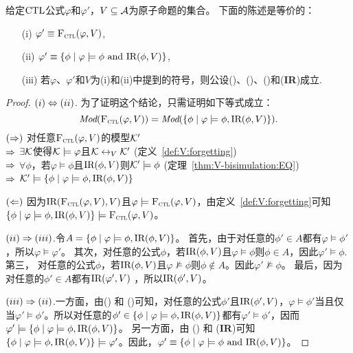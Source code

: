 \begin{theorem}\label{thm:close}
	给定$\textrm{CTL}$公式$\varphi$和$\varphi'$，$V \subseteq {\cal A}$为原子命题的集合。
	下面的陈述是等价的：
	\begin{itemize}
		\item[(i)] $\varphi' \equiv {\textsc{F}_{\textsc{ctl}}}(\varphi, V)$,
		\item[(ii)] $\varphi'\equiv \{\phi \mid\varphi \models \phi \text{ and } \textrm{IR}(\phi, V)\}$,
		\item[(iii)] 若$\varphi$、$\varphi'$和$V$为(i)和(ii)中提到的符号，则公设(\W)、(\PP)、(\NgP)和(\textbf{IR})成立. 
	\end{itemize}
\end{theorem}
\begin{proof}
	$(i) \Leftrightarrow (ii)$. 为了证明这个结论，只需证明如下等式成立：
	\[
	\textit{Mod}({\textsc{F}_{\textsc{ctl}}}(\varphi, V)) = \textit{Mod}(\{\phi \mid \varphi \models \phi, \textrm{IR}(\phi, V)\}).\]
	$(\Rightarrow)$ 对任意${\textsc{F}_{\textsc{ctl}}}(\varphi, V)$的模型${\cal K}'$ \\
	$\Rightarrow$  $\exists {\cal K}$使得${\cal K} \models \varphi$且${\cal K} \leftrightarrow_V {\cal K}'$ \hfill (定义~\ref{def:V:forgetting}) \\
	$\Rightarrow$ $\forall \phi$，若$\varphi \models \phi$且$\textrm{IR}(\phi, V)$则${\cal K}' \models \phi$  \hfill (定理~\ref{thm:V-bisimulation:EQ})\\
	$\Rightarrow$ ${\cal K}' \models \{\phi \mid \varphi \models \phi, \textrm{IR}(\phi, V)\}$
	
	$(\Leftarrow)$ 因为$\textrm{IR}({\textsc{F}_{\textsc{ctl}}}(\varphi, V),V)$且$\varphi \models {\textsc{F}_{\textsc{ctl}}}(\varphi, V)$，由定义~\ref{def:V:forgetting}可知$\{\phi \mid \varphi \models \phi, \textrm{IR}(\phi, V)\} \models {\textsc{F}_{\textsc{ctl}}}(\varphi, V)$。
	
	$(ii) \Rightarrow (iii)$.令$A = \{\phi \mid \varphi \models \phi, \textrm{IR}(\phi, V)\}$。 
	首先，由于对任意的$\phi'\in A$都有$\varphi \models \phi'$，所以$\varphi \models \varphi'$。
	其次，对任意的公式$\phi$，若$\textrm{IR}(\phi, V)$且$\varphi \models \phi$则$\phi \in A$，因此$\varphi' \models \phi$.
	第三， 对任意的公式$\phi$，若$\textrm{IR}(\phi, V)$且$\varphi \not \models \phi$则$\phi \not \in A$。因此$\varphi' \not \models \phi$。
	最后，因为对任意的$\phi' \in A$都有$\textrm{IR}(\varphi',V)$ ，所以$\textrm{IR}(\phi',V)$。
	
	$(iii) \Rightarrow (ii)$.一方面，由(\PP) 和 (\NgP)可知，对任意的公式$\phi'$且$\textrm{IR}(\phi',V)$，$\varphi \models \phi'$当且仅当$\varphi' \models \phi'$。所以对任意的$\phi'\in \{\phi \mid \varphi \models \phi, \textrm{IR}(\phi, V)\}$都有$\varphi' \models \phi'$，因而$\varphi' \models \{\phi \mid \varphi \models \phi, \textrm{IR}(\phi, V)\}$。 
	另一方面，由 (\W) 和 (\textbf{IR})可知$\{\phi \mid \varphi \models \phi, \textrm{IR}(\phi, V)\} \models \varphi'$。因此，$\varphi'\equiv \{\phi \mid\varphi \models \phi \text{ and } \textrm{IR}(\phi, V)\}$。
\end{proof}

